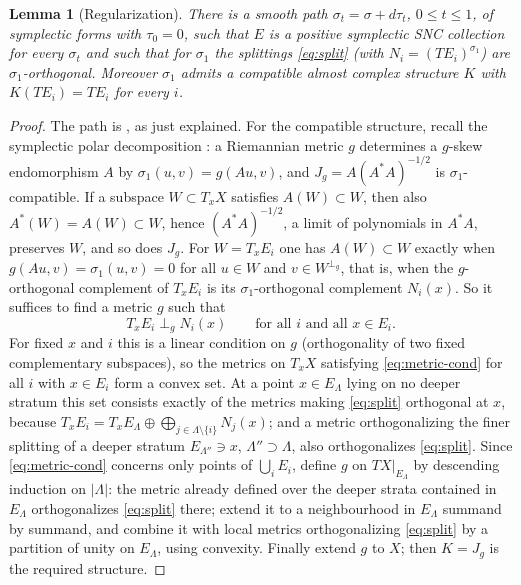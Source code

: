 \documentclass[12pt]{article}
\newtheorem{lemma}[theorem]{Lemma}
\theoremstyle{remark}
\begin{document}
\begin{lemma}[Regularization]\label{lem:reg}
There is a smooth path $\sigma_t=\sigma+d\tau_t$, $0\le t\le1$, of
symplectic forms with $\tau_0=0$, such that $E$ is a positive symplectic
SNC collection for every $\sigma_t$ and such that for $\sigma_1$ the
splittings \eqref{eq:split} (with $N_i=(TE_i)^{\sigma_1}$) are
$\sigma_1$-orthogonal. Moreover $\sigma_1$ admits a compatible almost
complex structure $K$ with $K(TE_i)=TE_i$ for every $i$.
\end{lemma}

\begin{proof}
The path is \cite[Theorem 2.13]{FMZ}, as just explained. For the
compatible structure, recall the symplectic polar decomposition
\cite[proof of Theorem 2.16]{Wendl}: a Riemannian metric $g$ determines
a $g$-skew endomorphism $A$ by $\sigma_1(u,v)=g(Au,v)$, and
$J_g=A(A^*A)^{-1/2}$ is $\sigma_1$-compatible. If a subspace
$W\subset T_xX$ satisfies $A(W)\subset W$, then also
$A^*(W)=A(W)\subset W$, hence $(A^*A)^{-1/2}$, a limit of polynomials in
$A^*A$, preserves $W$, and so does $J_g$. For $W=T_xE_i$ one has
$A(W)\subset W$ exactly
when $g(Au,v)=\sigma_1(u,v)=0$ for all $u\in W$ and $v\in W^{\perp_g}$,
that is, when the $g$-orthogonal complement of $T_xE_i$ is its
$\sigma_1$-orthogonal complement $N_i(x)$. So it suffices to find a
metric $g$ such that
\begin{equation}\label{eq:metric-cond}
 T_xE_i\perp_g N_i(x)\qquad\text{for all }i\text{ and all }x\in E_i.
\end{equation}
For fixed $x$ and $i$ this is a linear condition on $g$ (orthogonality
of two fixed complementary subspaces), so the metrics on $T_xX$
satisfying \eqref{eq:metric-cond} for all $i$ with $x\in E_i$ form a
convex set. At a point $x\in E_\Lambda$ lying on no deeper stratum this
set consists exactly of the metrics making \eqref{eq:split} orthogonal
at $x$, because
$T_xE_i=T_xE_\Lambda\oplus\bigoplus_{j\in\Lambda\setminus\{i\}}N_j(x)$;
and a metric orthogonalizing the finer splitting of a deeper stratum
$E_{\Lambda''}\ni x$, $\Lambda''\supset\Lambda$, also orthogonalizes
\eqref{eq:split}. Since \eqref{eq:metric-cond} concerns only points of
$\bigcup_iE_i$, define $g$ on $TX|_{E_\Lambda}$ by descending induction
on $|\Lambda|$: the metric already defined over the deeper strata
contained in $E_\Lambda$ orthogonalizes \eqref{eq:split} there; extend
it to a neighbourhood in $E_\Lambda$ summand by summand, and combine it
with local metrics orthogonalizing \eqref{eq:split} by a partition of
unity on $E_\Lambda$, using convexity. Finally extend $g$ to $X$; then
$K=J_g$ is the required structure.
\end{proof}
\end{document}
